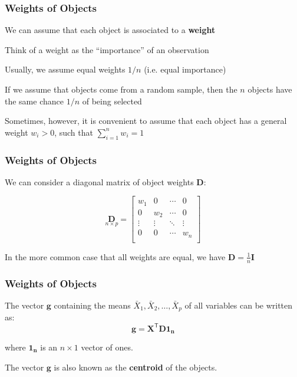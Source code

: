 \documentclass[12pt]{beamer}\usepackage[]{graphicx}\usepackage[]{color}
\begin{document}

\begin{frame}
\frametitle{Weights of Objects}

\bi
  \item We can assume that each object is associated to a \textbf{weight}
  \item Think of a weight as the ``importance'' of an observation
  \item Usually, we assume equal weights $1/n$ (i.e. equal importance)
  \item If we assume that objects come from a random sample, then 
  the $n$ objects have the same chance $1/n$ of being selected
  \item Sometimes, however, it is convenient to assume that each object
  has a general weight $w_i > 0$, such that $\sum_{i=1}^{n} w_i = 1$
\ei

\end{frame}


\begin{frame}
\frametitle{Weights of Objects}

We can consider a diagonal matrix of object weights $\mathbf{D}$:

\[ \underset{n \times p}{\mathbf{D}} = 
\left[\begin{array}{cccc}
w_1 & 0 & \cdots & 0 \\
0 & w_2 & \cdots & 0 \\
\vdots & \vdots & \ddots & \vdots \\
0 & 0 & \cdots & w_n \\
\end{array}\right]
\]

In the more common case that all weights are equal, we have $\mathbf{D} = \frac{1}{n} \mathbf{I}$

\end{frame}


\begin{frame}
\frametitle{Weights of Objects}

The vector $\mathbf{g}$ containing the means $\bar{X}_1, \bar{X}_2, \dots, \bar{X}_p$ 
of all variables can be written as:
$$
\mathbf{g} = \mathbf{X^\mathsf{T} D 1_n}
$$

where $\mathbf{1_n}$ is an $n \times 1$ vector of ones.

\bigskip
The vector $\mathbf{g}$ is also known as the \textbf{centroid} of the objects.

\end{frame}
\end{document}
